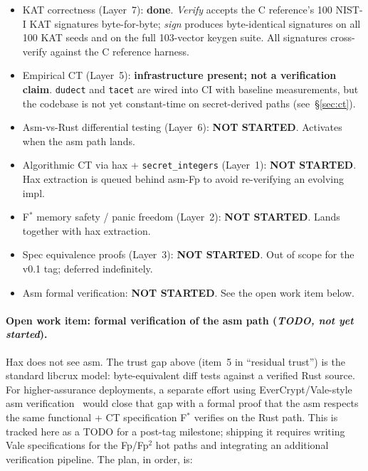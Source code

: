 \begin{itemize}[nosep]
  \item KAT correctness (Layer~7): \textbf{done}.
        \emph{Verify} accepts the C reference's 100 NIST-I KAT
        signatures byte-for-byte; \emph{sign} produces
        byte-identical signatures on all 100 KAT seeds and on the
        full 103-vector keygen suite.  All signatures cross-verify
        against the C reference harness.
  \item Empirical CT (Layer~5): \textbf{infrastructure present;
        not a verification claim}.  \texttt{dudect} and
        \texttt{tacet} are wired into CI with baseline measurements,
        but the codebase is not yet constant-time on secret-derived
        paths (see~\S\ref{sec:ct}).
  \item Asm-vs-Rust differential testing (Layer~6):
        \textbf{NOT STARTED}.  Activates when the asm path lands.
  \item Algorithmic CT via hax + \texttt{secret\_integers}
        (Layer~1): \textbf{NOT STARTED}.  Hax extraction is queued
        behind asm-Fp to avoid re-verifying an evolving impl.
  \item F$^*$ memory safety / panic freedom (Layer~2):
        \textbf{NOT STARTED}.  Lands together with hax extraction.
  \item Spec equivalence proofs (Layer~3): \textbf{NOT STARTED}.
        Out of scope for the v0.1 tag; deferred indefinitely.
  \item Asm formal verification: \textbf{NOT STARTED}.  See the
        open work item below.
\end{itemize}

\paragraph{Open work item: formal verification of the asm path
(\emph{TODO, not yet started}).}
Hax does not see asm.  The trust gap above (item~5 in ``residual
trust'') is the standard libcrux model: byte-equivalent diff tests
against a verified Rust source.  For higher-assurance deployments,
a separate effort using EverCrypt/Vale-style asm
verification~\cite{vale-asm} would close that gap with a formal
proof that the asm respects the same functional + CT specification
F$^*$ verifies on the Rust path.  This is tracked here as a
TODO for a post-tag milestone; shipping it requires writing Vale
specifications for the Fp/Fp$^2$ hot paths and integrating an
additional verification pipeline.  The plan, in order, is:

